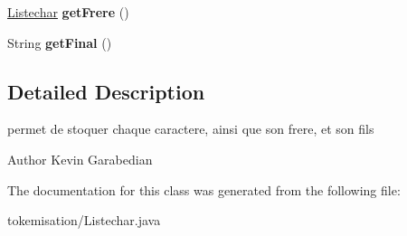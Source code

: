 \begin{DoxyCompactItemize}
\item 
\hyperlink{classtokemisation_1_1_listechar}{Listechar} {\bfseries get\+Frere} ()\hypertarget{classtokemisation_1_1_listechar_a51907515c716c508d49faeff3d0adc5b}{}\label{classtokemisation_1_1_listechar_a51907515c716c508d49faeff3d0adc5b}

\item 
String {\bfseries get\+Final} ()\hypertarget{classtokemisation_1_1_listechar_ab310a59ec0373dc564ad64188232d7ba}{}\label{classtokemisation_1_1_listechar_ab310a59ec0373dc564ad64188232d7ba}

\end{DoxyCompactItemize}


\subsection{Detailed Description}
permet de stoquer chaque caractere, ainsi que son frere, et son fils 

\begin{DoxyAuthor}{Author}
Kevin Garabedian 
\end{DoxyAuthor}


The documentation for this class was generated from the following file\+:\begin{DoxyCompactItemize}
\item 
tokemisation/Listechar.\+java\end{DoxyCompactItemize}
